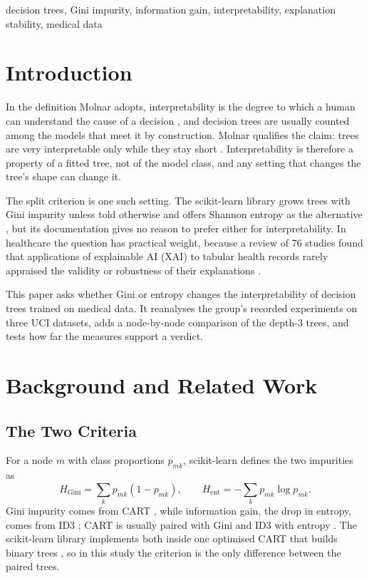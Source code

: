 \documentclass[conference,10pt]{IEEEtran}
\begin{document}
\begin{IEEEkeywords}
decision trees, Gini impurity, information gain, interpretability, explanation stability, medical data
\end{IEEEkeywords}

\section{Introduction}
In the definition Molnar adopts, interpretability is the degree to which a human can understand the cause of a decision \cite{molnar2025}, and decision trees are usually counted among the models that meet it by construction. Molnar qualifies the claim: trees are very interpretable only while they stay short \cite{molnar2025}. Interpretability is therefore a property of a fitted tree, not of the model class, and any setting that changes the tree's shape can change it.

The split criterion is one such setting. The scikit-learn library grows trees with Gini impurity unless told otherwise and offers Shannon entropy as the alternative \cite{sklearnDTC}, but its documentation gives no reason to prefer either for interpretability. In healthcare the question has practical weight, because a review of 76 studies found that applications of explainable AI (XAI) to tabular health records rarely appraised the validity or robustness of their explanations \cite{caterson2024}.

This paper asks whether Gini or entropy changes the interpretability of decision trees trained on medical data. It reanalyses the group's recorded experiments on three UCI datasets, adds a node-by-node comparison of the depth-3 trees, and tests how far the measures support a verdict.

\section{Background and Related Work}
\subsection{The Two Criteria}
For a node $m$ with class proportions $p_{mk}$, scikit-learn defines the two impurities as \cite{sklearnTree}
\begin{equation}
H_{\mathrm{Gini}}=\sum_k p_{mk}(1-p_{mk}),\qquad H_{\mathrm{ent}}=-\sum_k p_{mk}\log p_{mk}.
\end{equation}
Gini impurity comes from CART \cite{breiman2017}, while information gain, the drop in entropy, comes from ID3 \cite{quinlan1986}; CART is usually paired with Gini and ID3 with entropy \cite{kavlakoglu2021}. The scikit-learn library implements both inside one optimised CART that builds binary trees \cite{sklearnTree}, so in this study the criterion is the only difference between the paired trees.
\end{document}
